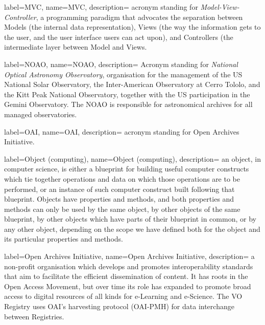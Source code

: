 {
    label={MVC},
    name={MVC},
    description={
    	acronym standing for \emph{Model-View-Controller}, a
        programming paradigm that advocates the separation between
        \gls{Models} (the internal data representation), \gls{Views}
        (the way the information gets to the user, and the user
        interface users can act upon), and \gls{Controllers} (the
        intermediate layer between Model and Views.
    }
}

{
    label={NOAO},
    name={NOAO},
    description={
    	Acronym standing for \emph{National Optical Astronomy
        Observatory}, organisation for the management of the US
        National Solar Observatory, the Inter-American Observatory at
        Cerro Tololo, and the Kitt Peak National Observatory, together
        with the US participation in the Gemini Observatory. The NOAO
        is responsible for astronomical archives for all managed
        observatories.
    }
}

{
    label={OAI},
    name={OAI},
    description={
    	acronym standing for \gls{Open Archives Initiative}.
    }
}

{
    label={Object (computing)},
    name={Object (computing)},
    description={
    	an object, in computer science, is either a blueprint for
        building useful computer constructs which tie together
        operations and data on which those operations are to be
        performed, or an instance of such computer construct built
        following that blueprint. Objects have properties and methods,
        and both properties and methods can only be used by the same
        object, by other objects of the same blueprint, by other
        objects which have parts of their blueprint in common, or by
        any other object, depending on the scope we have defined both
        for the object and its particular properties and methods.
    }
}

{
    label={Open Archives Initiative},
    name={Open Archives Initiative},
    description={
    	a non-profit organisation which develops and promotes
        interoperability standards that aim to facilitate the efficient
        dissemination of content. It has roots in the Open Access
        Movement, but over time its role has expanded to promote broad
        access to digital resources of all kinds for \gls{e-Learning}
        and \gls{e-Science}. The VO \gls{Registry} uses OAI's
        harvesting protocol (OAI-PMH) for data interchange between
        Registries.
    }
}

